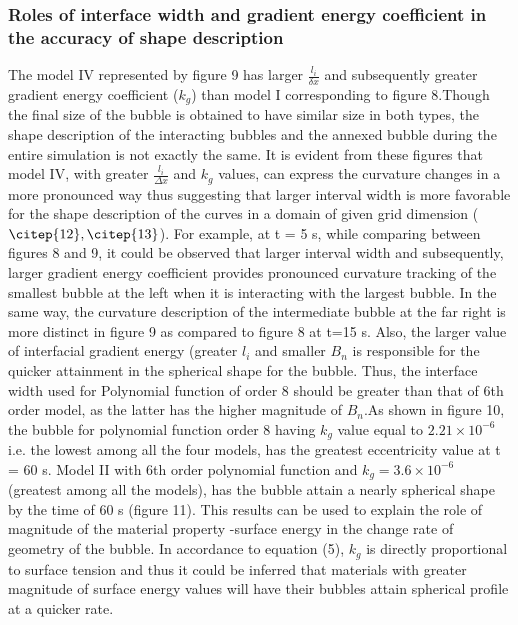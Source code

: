 \documentclass[10pt,a4paper]{article}
\begin{document}
\subsubsection{Roles of interface width and gradient energy coefficient in the accuracy of shape description}
The model IV represented by figure 9 has larger $\frac{l_{i}}{\delta x}$ and subsequently greater gradient energy coefficient ($k_{g}$) than model I corresponding to figure 8.Though the final size of the bubble is obtained to have similar size in both types, the shape description of the interacting bubbles and the annexed bubble during the entire simulation is not exactly the same. It is evident from these figures that model IV, with greater $\frac{l_{i}}{\Delta x}$ and  $k_{g}$ values, can express the curvature changes in a more pronounced way thus suggesting that larger interval width is more favorable for the shape description of the curves in a domain of given grid dimension ($\citep{12}, \citep{13}$). For example, at t = 5 s, while comparing between figures 8 and 9, it could be observed that larger interval width and subsequently, larger gradient energy coefficient provides pronounced curvature tracking of the smallest bubble at the left when it is interacting with the largest bubble. In the same way, the curvature description of the intermediate bubble at the far right is more distinct in figure 9 as compared to figure 8 at t=15 s.  Also, the larger value of interfacial gradient energy (greater $l_{i}$ and smaller $B_n$ is responsible for the quicker attainment in the spherical shape for the bubble. Thus, the interface width used for Polynomial function of order 8 should be greater than that of 6th order model, as the latter has the higher magnitude of $B_n$.As shown in figure 10, the bubble for polynomial function order 8 having $k_g$ value equal to $2.21 \times 10 ^{-6}$ i.e. the lowest among all the four models, has the greatest eccentricity value at t = 60 s. Model II with 6th order polynomial function and $k_g = 3.6 \times 10 ^{-6}$ (greatest among all the models), has the bubble attain a nearly spherical shape by the time of 60 s (figure 11). This results can be used to explain the role of magnitude of the material property -surface energy in the change rate of geometry of the bubble. In accordance to equation (5), $k_g$ is directly proportional to surface tension and thus  it could be inferred that materials with greater magnitude of surface energy values will have their bubbles attain spherical profile at a quicker rate. 
\end{document}
